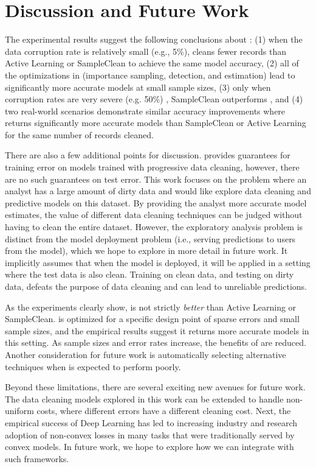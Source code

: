 \section{Discussion and Future Work}
The experimental results suggest the following conclusions about \sys: (1) when the data corruption rate is relatively small (e.g., 5\%), \sys cleans fewer records than Active Learning or SampleClean to achieve the same model accuracy, (2) all of the optimizations in \sys (importance sampling, detection, and estimation) lead to significantly more accurate models at small sample sizes, (3) only when corruption rates are very severe (e.g. 50\%) , SampleClean outperforms \sys, and (4) two real-world scenarios demonstrate similar accuracy improvements where \sys returns significantly more accurate models than SampleClean or Active Learning for the same number of records cleaned.

There are also a few additional points for discussion.
\sys provides guarantees for training error on models trained with progressive data cleaning, however, there are no such guarantees on test error. 
This work focuses on the problem where an analyst has a large amount of dirty data and would like explore data cleaning and predictive models on this dataset.
By providing the analyst more accurate model estimates, the value of different data cleaning techniques can be judged without having to clean the entire dataset.
However, the exploratory analysis problem is distinct from the model deployment problem (i.e., serving predictions to users from the model), which we hope to explore in more detail in future work.
It implicitly assumes that when the model is deployed, it will be applied in a setting where the test data is also clean.
Training on clean data, and testing on dirty data, defeats the purpose of data cleaning and can lead to unreliable predictions.

As the experiments clearly show, \sys is not strictly \emph{better} than Active Learning or SampleClean.
\sys is optimized for a specific design point of sparse errors and small sample sizes, and the empirical results suggest it returns more accurate models in this setting.
As sample sizes and error rates increase, the benefits of \sys are reduced.
Another consideration for future work is automatically selecting alternative techniques when \sys is expected to perform poorly.

Beyond these limitations, there are several exciting new avenues for future work.
The data cleaning models explored in this work can be extended to handle non-uniform costs, where different errors have a different cleaning cost.
Next, the empirical success of Deep Learning has led to increasing industry and research adoption of non-convex losses in many tasks that were traditionally served by convex models.
In future work, we hope to explore how we can integrate with such frameworks.

